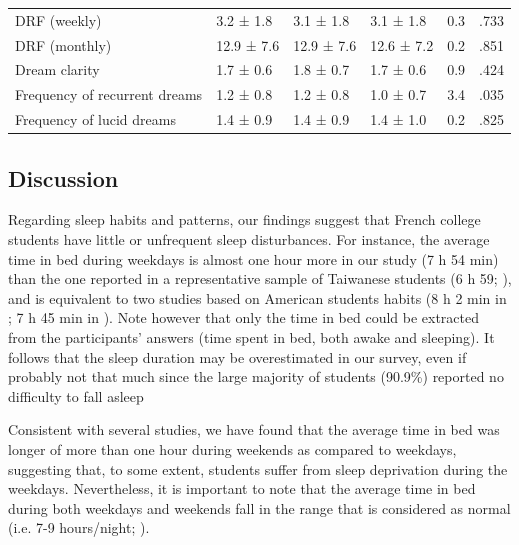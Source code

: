 \begin{table}[!htbp]
\begin{tabularx}{\textwidth}{bXXXll}
    DRF (weekly)                   & 3.2 ± 1.8  & 3.1 ± 1.8  & 3.1 ± 1.8  & 0.3    & .733 \\
    DRF (monthly)                  & 12.9 ± 7.6 & 12.9 ± 7.6 & 12.6 ± 7.2 & 0.2    & .851 \\
    Dream clarity                  & 1.7 ± 0.6  & 1.8 ± 0.7  & 1.7 ± 0.6  & 0.9    & .424 \\
    Frequency of recurrent dreams  & 1.2 ± 0.8  & 1.2 ± 0.8  & 1.0 ± 0.7  & 3.4    & .035 \\
    Frequency of lucid dreams      & 1.4 ± 0.9  & 1.4 ± 0.9  & 1.4 ± 1.0  & 0.2    & .825 \\ \bottomrule
    \end{tabularx}
\end{table}

\FloatBarrier

\subsection*{Discussion}
\label{res:survey:discussion}

Regarding sleep habits and patterns, our findings suggest that French college students have little or unfrequent sleep disturbances. For instance, the average time in bed during weekdays is almost one hour more in our study (7 h 54 min) than the one reported in a representative sample of Taiwanese students (6 h 59; \citealp{tsai_sleep_2004}), and is equivalent to two studies based on American students habits (8 h 2 min in \citealp{buboltz_sleep_2001}; 7 h 45 min in \citealp{lund_sleep_2010}). Note however that only the time in bed could be extracted from the participants’ answers (time spent in bed, both awake and sleeping). It follows that the sleep duration may be overestimated in our survey, even if probably not that much since the large majority of students (90.9\%) reported no difficulty to fall asleep

Consistent with several studies, we have found that the average time in bed was longer of more than one hour during weekends as compared to weekdays, suggesting that, to some extent, students suffer from sleep deprivation during the weekdays. Nevertheless, it is important to note that the average time in bed during both weekdays and weekends fall in the range that is considered as normal (i.e. 7-9 hours/night; \citealp{hirshkowitz_normal_2004}).

